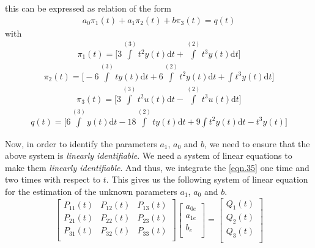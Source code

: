 \documentclass{article}
\begin{document}
this can be expressed as relation of the form
\begin{equation}\label{eqn.35}
\begin{split}
a_{0}\pi_{1}(t) + a_{1}\pi_{2}(t) + b\pi_{3}(t) = q(t)
\end{split}
\end{equation}
with
\begin{align*}
\pi_{1}(t) = \bigg[3\int\limits^{(3)}t^2y(t)\mathrm{d}t + \int\limits^{(2)}t^3y(t)\mathrm{d}t\bigg]
\end{align*}
\begin{align*}
\pi_{2}(t) = \bigg[-6\int\limits^{(3)} ty(t)\mathrm{d}t + 6\int\limits^{(2)}t^2y(t) \mathrm{d}t + \int t^3y(t)\mathrm{d}t\bigg]
\end{align*}
\begin{align*}
\pi_{3} (t) = \bigg[3 \int\limits^{(3)} t^2 u(t) \mathrm{d}t - \int\limits^{(2)} t^3 u(t) \mathrm{d}t \bigg]
\end{align*}
\begin{align*}
q(t) = \bigg[ 6\int\limits^{(3)}y(t) \mathrm{d}t - 18\int\limits^{(2)}ty(t)\mathrm{d}t + 9\int t^2y(t)\mathrm{d}t - t^3y(t) \bigg]
\end{align*}
\par Now, in order to identify the parameters $a_{1}$, $a_{0}$ and $b$, we need to ensure that the above system is \textit{linearly identifiable}. We need a system of linear equations to make them \textit{linearly identifiable}. And thus, we integrate the \eqref{eqn.35} one time and two times with respect to $t$. This gives us the following system of linear equation for the estimation of the unknown parameters $a_{1}$, $a_{0}$ and $b$.
\begin{equation}
\begin{bmatrix}
P_{11}(t) & P_{12}(t) & P_{13}(t) \\
P_{21}(t) & P_{22}(t) & P_{23}(t) \\
P_{31}(t) & P_{32}(t) & P_{33}(t) \\
\end{bmatrix}
\begin{bmatrix}
a_{0e} \\
a_{1e} \\
b_{e} \\
\end{bmatrix}
= 
\begin{bmatrix}
Q_{1}(t) \\
Q_{2}(t) \\
Q_{3}(t) \\
\end{bmatrix}
\end{equation}
\end{document}
